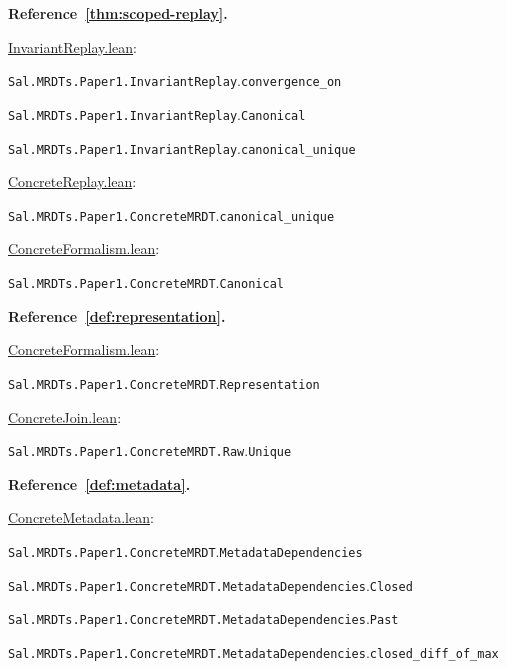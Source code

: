 \medskip\noindent\textbf{Reference~\ref{thm:scoped-replay}.}\par\nobreak
\noindent\href{https://github.com/fplaunchpad/sal/blob/07fe525/Sal/MRDTs/Paper1/InvariantReplay.lean}{InvariantReplay.lean}:\par
{\small\nolinkurl{Sal.MRDTs.Paper1.InvariantReplay}.\allowbreak\nolinkurl{convergence_on}}\par
{\small\nolinkurl{Sal.MRDTs.Paper1.InvariantReplay}.\allowbreak\nolinkurl{Canonical}}\par
{\small\nolinkurl{Sal.MRDTs.Paper1.InvariantReplay}.\allowbreak\nolinkurl{canonical_unique}}\par
\noindent\href{https://github.com/fplaunchpad/sal/blob/paper1/Sal/MRDTs/Paper1/ConcreteReplay.lean}{ConcreteReplay.lean}:\par
{\small\nolinkurl{Sal.MRDTs.Paper1.ConcreteMRDT}.\allowbreak\nolinkurl{canonical_unique}}\par
\noindent\href{https://github.com/fplaunchpad/sal/blob/paper1/Sal/MRDTs/Paper1/ConcreteFormalism.lean}{ConcreteFormalism.lean}:\par
{\small\nolinkurl{Sal.MRDTs.Paper1.ConcreteMRDT}.\allowbreak\nolinkurl{Canonical}}\par

\medskip\noindent\textbf{Reference~\ref{def:representation}.}\par\nobreak
\noindent\href{https://github.com/fplaunchpad/sal/blob/paper1/Sal/MRDTs/Paper1/ConcreteFormalism.lean}{ConcreteFormalism.lean}:\par
{\small\nolinkurl{Sal.MRDTs.Paper1.ConcreteMRDT}.\allowbreak\nolinkurl{Representation}}\par
\noindent\href{https://github.com/fplaunchpad/sal/blob/paper1/Sal/MRDTs/Paper1/ConcreteJoin.lean}{ConcreteJoin.lean}:\par
{\small\nolinkurl{Sal.MRDTs.Paper1.ConcreteMRDT.Raw}.\allowbreak\nolinkurl{Unique}}\par

\medskip\noindent\textbf{Reference~\ref{def:metadata}.}\par\nobreak
\noindent\href{https://github.com/fplaunchpad/sal/blob/paper1/Sal/MRDTs/Paper1/ConcreteMetadata.lean}{ConcreteMetadata.lean}:\par
{\small\nolinkurl{Sal.MRDTs.Paper1.ConcreteMRDT}.\allowbreak\nolinkurl{MetadataDependencies}}\par
{\small\nolinkurl{Sal.MRDTs.Paper1.ConcreteMRDT.MetadataDependencies}.\allowbreak\nolinkurl{Closed}}\par
{\small\nolinkurl{Sal.MRDTs.Paper1.ConcreteMRDT.MetadataDependencies}.\allowbreak\nolinkurl{Past}}\par
{\small\nolinkurl{Sal.MRDTs.Paper1.ConcreteMRDT.MetadataDependencies}.\allowbreak\nolinkurl{closed_diff_of_max}}\par

